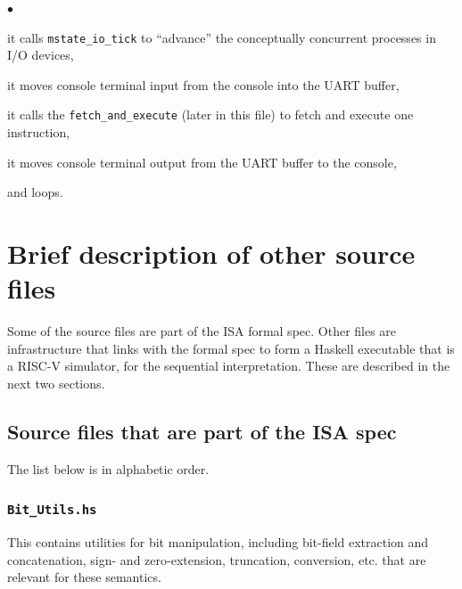 \documentclass[11pt]{article}
\newenvironment{tightlist}%
{\begin{list}{$\bullet$}{%
    \setlength{\topsep}{0in}
    \setlength{\partopsep}{0in}
    \setlength{\itemsep}{0in}
    \setlength{\parsep}{0in}
    \setlength{\leftmargin}{1.5em}
    \setlength{\rightmargin}{0in}
    \setlength{\itemindent}{0in}
}
}%
{\end{list}
}
\begin{document}
\begin{tightlist}

\item it calls \verb|mstate_io_tick| to ``advance'' the conceptually
concurrent processes in I/O devices,

\item it moves console terminal input from the console into the UART
      buffer,

\item it calls the \verb|fetch_and_execute| (later in this file) to
      fetch and execute one instruction,

\item it moves console terminal output from the UART buffer to the
      console,

\item and loops.

\end{tightlist}



\section{Brief description of other source files}

\label{sec_misc}

Some of the source files are part of the ISA formal spec.  Other files
are infrastructure that links with the formal spec to form a Haskell
executable that is a RISC-V simulator, for the sequential
interpretation.  These are described in the next two sections.


\subsection{Source files that are part of the ISA spec}

The list below is in alphabetic order.


\subsubsection{\tt Bit\_Utils.hs}

This contains utilities for bit manipulation, including bit-field
extraction and concatenation, sign- and zero-extension, truncation,
conversion, etc. that are relevant for these semantics.
\end{document}
